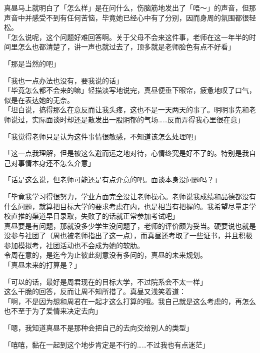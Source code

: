 真昼马上就明白了「怎么样」是在问什么，伤脑筋地发出了「唔～」的声音，但那声音中并感受不到有任何苦恼，毕竟她已经心中有了分别，因而身周的氛围都很轻松。\\

「怎么说呢，这个问题好难回答啊。关于父母不会来这件事，老师在这一年半的时间里怎么也都清楚了，讲一声也就过去了，顶多就是老师脸色有点不好看」

「那是当然的吧」

「我也一点办法也没有，要我说的话」\\

「毕竟怎么都不会来的嘛」轻描淡写地说完，真昼便垂下眼帘，疲惫地叹了口气，似是在表达她的无奈。\\

「坦白说，搞得那么在意反而让我头疼，这也不是一天两天的事了。明明事先和老师说过，实际面谈时却还是散发出一股阴郁的气场……反而弄得我心里很在意」

「我觉得老师只是认为这件事情很敏感，不知道该怎么处理吧」

「这一点我理解，但是被这么避而远之地对待，心情终究是好不了的。特别是我自己对事情本身还不怎么介意」

「话是这么说，但老师可能还是有点介意的吧。面谈本身没问题吗？」

「毕竟我学习得很努力，学业方面完全没让老师操心。老师说我成绩和品德都没有什么问题，就算把目标大学的要求考虑在内，也是相当有把握的。我希望尽量走学校直推的渠道早日录取，失败了的话就正常参加考试吧」\\

真昼要是有问题，那就没多少学生没问题了，老师的评价颇为妥当。硬要说也就是没参与社团了（周也被老师指出了这一点），而真昼还考取了一些证书，并且积极参加模拟考，社团活动也不会成为她的软肋。\\

令周在意的，是迄今为止彼此刻意没有多问的，真昼的未来规划。\\

「真昼未来的打算是？」

「可以的话，最好是周君现在的目标大学，不过院系会不太一样」\\

这么干脆的回答，反而让周不知所措了。真昼又浅笑着道：\\

「啊，不是因为想和周君在一起才这么打算的哦。我自己就是这么考虑的，再怎么也不至于为了爱情来决定去向」

「嗯，我知道真昼不是那种会把自己的去向交给别人的类型」

「嘻嘻，黏在一起到这个地步肯定是不行的……不过我也有点迷茫」


